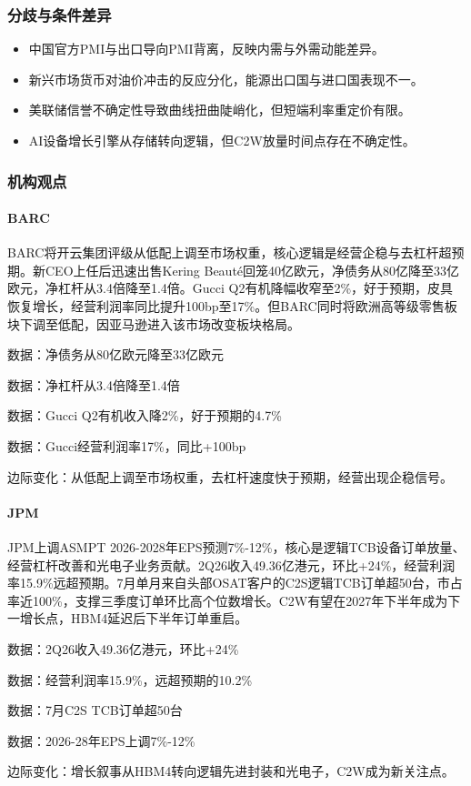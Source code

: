 \documentclass[11pt]{ctexart}
\begin{document}
\subsubsection*{分歧与条件差异}
\begin{itemize}
  \item 中国官方PMI与出口导向PMI背离，反映内需与外需动能差异。
  \item 新兴市场货币对油价冲击的反应分化，能源出口国与进口国表现不一。
  \item 美联储信誉不确定性导致曲线扭曲陡峭化，但短端利率重定价有限。
  \item AI设备增长引擎从存储转向逻辑，但C2W放量时间点存在不确定性。
\end{itemize}
\subsubsection*{机构观点}
\paragraph{BARC} BARC将开云集团评级从低配上调至市场权重，核心逻辑是经营企稳与去杠杆超预期。新CEO上任后迅速出售Kering Beauté回笼40亿欧元，净债务从80亿降至33亿欧元，净杠杆从3.4倍降至1.4倍。Gucci Q2有机降幅收窄至2\%，好于预期，皮具恢复增长，经营利润率同比提升100bp至17\%。但BARC同时将欧洲高等级零售板块下调至低配，因亚马逊进入该市场改变板块格局。
{\small\color{refgray}数据：净债务从80亿欧元降至33亿欧元\par}
{\small\color{refgray}数据：净杠杆从3.4倍降至1.4倍\par}
{\small\color{refgray}数据：Gucci Q2有机收入降2\%，好于预期的4.7\%\par}
{\small\color{refgray}数据：Gucci经营利润率17\%，同比+100bp\par}
{\small\color{refgray}边际变化：从低配上调至市场权重，去杠杆速度快于预期，经营出现企稳信号。\par}
\paragraph{JPM} JPM上调ASMPT 2026-2028年EPS预测7\%-12\%，核心是逻辑TCB设备订单放量、经营杠杆改善和光电子业务贡献。2Q26收入49.36亿港元，环比+24\%，经营利润率15.9\%远超预期。7月单月来自头部OSAT客户的C2S逻辑TCB订单超50台，市占率近100\%，支撑三季度订单环比高个位数增长。C2W有望在2027年下半年成为下一增长点，HBM4延迟后下半年订单重启。
{\small\color{refgray}数据：2Q26收入49.36亿港元，环比+24\%\par}
{\small\color{refgray}数据：经营利润率15.9\%，远超预期的10.2\%\par}
{\small\color{refgray}数据：7月C2S TCB订单超50台\par}
{\small\color{refgray}数据：2026-28年EPS上调7\%-12\%\par}
{\small\color{refgray}边际变化：增长叙事从HBM4转向逻辑先进封装和光电子，C2W成为新关注点。\par}
\end{document}
